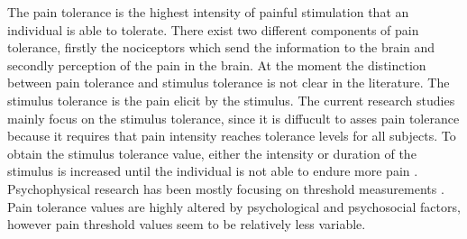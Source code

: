 The pain tolerance is the highest intensity of painful stimulation that an individual is able to tolerate. There exist two different components of pain tolerance, firstly the nociceptors which send the information to the brain and secondly perception of the pain in the brain.
At the moment the distinction between pain tolerance and stimulus tolerance is not clear in the literature. The stimulus tolerance is the pain elicit by the stimulus. The current research studies mainly focus on the stimulus tolerance, since it is diffucult to asses pain tolerance because it requires that pain intensity reaches tolerance levels for all subjects. \cite{Sivert2007} To obtain the stimulus tolerance value, either the intensity or duration of the stimulus is increased until the individual is not able to endure more pain \cite{Yarnitsky2006}. Psychophysical research has been mostly focusing on threshold measurements \cite{Pelli2010}. %
Pain tolerance values are highly altered by psychological and psychosocial factors, however pain threshold values seem to be relatively less variable. \cite{Yarnitsky2006} 
